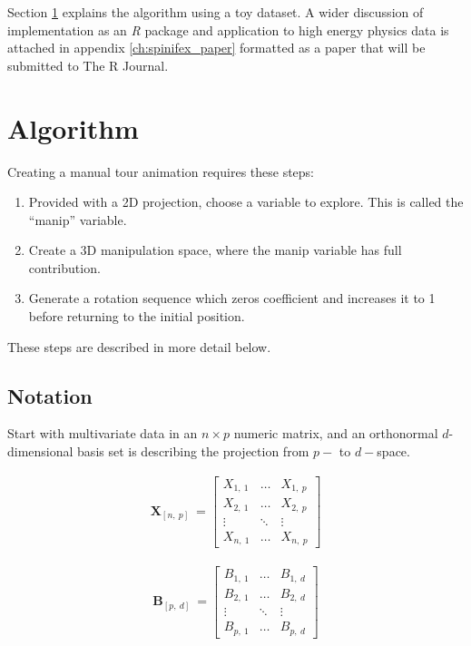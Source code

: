 \documentclass{monashthesis}
\begin{document}
Section \ref{sec:algorithm} explains the algorithm using a toy dataset.
A wider discussion of implementation as an \emph{R} package and
application to high energy physics data
\autocites{wang_visualizing_2018}{cook_dynamical_2018} is attached in
appendix \ref{ch:spinifex_paper} formatted as a paper that will be
submitted to The R Journal.

\section{Algorithm}\label{sec:algorithm}

Creating a manual tour animation requires these steps:

\begin{enumerate}
\def\labelenumi{\arabic{enumi}.}
\tightlist
\item
  Provided with a 2D projection, choose a variable to explore. This is
  called the ``manip'' variable.
\item
  Create a 3D manipulation space, where the manip variable has full
  contribution.
\item
  Generate a rotation sequence which zeros coefficient and increases it
  to 1 before returning to the initial position.
\end{enumerate}

These steps are described in more detail below.

\subsection{Notation}\label{notation}

Start with multivariate data in an \(n \times p\) numeric matrix, and an
orthonormal \(d\)-dimensional basis set is describing the projection
from \(p-\) to \(d-\)space.

\begin{align*}
  \textbf{X}_{[n,~p]} ~=
  \begin{bmatrix}
    X_{1,~1} & \dots  & X_{1,~p} \\
    X_{2,~1} & \dots  & X_{2,~p} \\
    \vdots   & \ddots & \vdots   \\
    X_{n,~1} & \dots  & X_{n,~p}
  \end{bmatrix}
\end{align*}

\begin{align*}
  \textbf{B}_{[p,~d]} ~=
  \begin{bmatrix}
    B_{1,~1} & \dots  & B_{1,~d} \\
    B_{2,~1} & \dots  & B_{2,~d} \\
    \vdots   & \ddots & \vdots   \\
    B_{p,~1} & \dots  & B_{p,~d}
  \end{bmatrix}
\end{align*}
\end{document}
